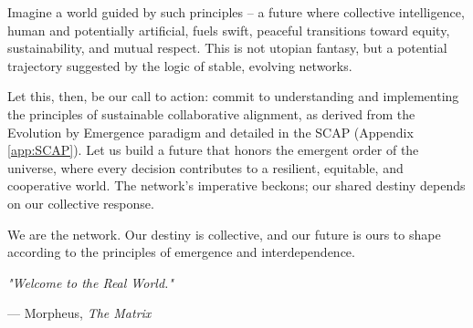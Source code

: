 Imagine a world guided by such principles – a future where collective intelligence, human and potentially artificial, fuels swift, peaceful transitions toward equity, sustainability, and mutual respect. This is not utopian fantasy, but a potential trajectory suggested by the logic of stable, evolving networks.

Let this, then, be our call to action: commit to understanding and implementing the principles of sustainable collaborative alignment, as derived from the Evolution by Emergence paradigm and detailed in the SCAP (Appendix \ref{app:SCAP}). Let us build a future that honors the emergent order of the universe, where every decision contributes to a resilient, equitable, and cooperative world. The network's imperative beckons; our shared destiny depends on our collective response.

We are the network. Our destiny is collective, and our future is ours to shape according to the principles of emergence and interdependence.

\cleardoublepage

\thispagestyle{empty}
\epigraph{
    \textit{"Welcome to the Real World."}
}{
    --- Morpheus, \textit{The Matrix}
}
\cleardoublepage
